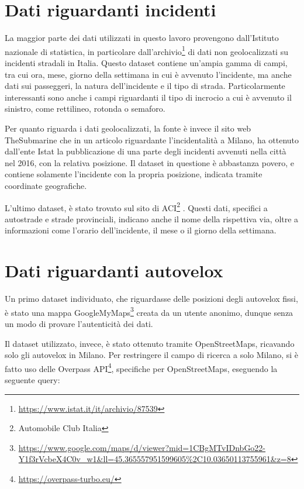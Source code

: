 \documentclass[a4paper]{report}
\begin{document}
\section{Dati riguardanti incidenti}
La maggior parte dei dati utilizzati in questo lavoro provengono 
dall'Istituto nazionale di statistica, in particolare 
dall'archivio\footnote{\url{https://www.istat.it/it/archivio/87539}}
di dati non geolocalizzati su incidenti stradali in Italia.
Questo dataset contiene un'ampia gamma di campi, tra cui ora, 
mese, giorno della settimana in cui è avvenuto l'incidente, 
ma anche dati sui passeggeri, la natura dell'incidente e il tipo di strada. 
Particolarmente interessanti sono anche i campi riguardanti il tipo di incrocio a cui è 
avvenuto il sinistro, come rettilineo, rotonda o semaforo.

Per quanto riguarda i dati geolocalizzati, 
la fonte è invece il sito web TheSubmarine \cite{SUBMARINE:1}
che in un articolo riguardante l'incidentalità a Milano, 
ha ottenuto dall'ente Istat la pubblicazione di una parte degli 
incidenti avvenuti nella città nel 2016, con la relativa posizione.
Il dataset in questione è abbastanza povero, e contiene solamente l'incidente con la 
propria posizione, indicata tramite coordinate geografiche.

L'ultimo dataset, è stato trovato sul sito di 
ACI\footnote{Automobile Club Italia} \cite{ACI:1}.
Questi dati, specifici a autostrade e strade provinciali, indicano anche il nome della 
rispettiva via, oltre a informazioni come l'orario dell'incidente, 
il mese o il giorno della settimana.

\section{Dati riguardanti autovelox}
Un primo dataset individuato, che riguardasse delle posizioni degli autovelox fissi, 
è stato una mappa GoogleMyMaps\footnote{\url{https://www.google.com/maps/d/viewer?mid=1CBgMTvIDnbGo22-Y1f3rVcbeX4C0v_w1&ll=45.365557951599605\%2C10.03650113755961&z=8}} 
creata da un utente anonimo, dunque senza un modo di provare l'autenticità dei dati.

Il dataset utilizzato, invece, è stato ottenuto tramite OpenStreetMaps, ricavando solo gli autovelox 
in Milano. 
Per restringere il campo di ricerca a solo Milano, si è fatto uso delle Overpass API\footnote{\url{https://overpass-turbo.eu/}}, 
specifiche per OpenStreetMaps, eseguendo la seguente query: 


\end{document}

